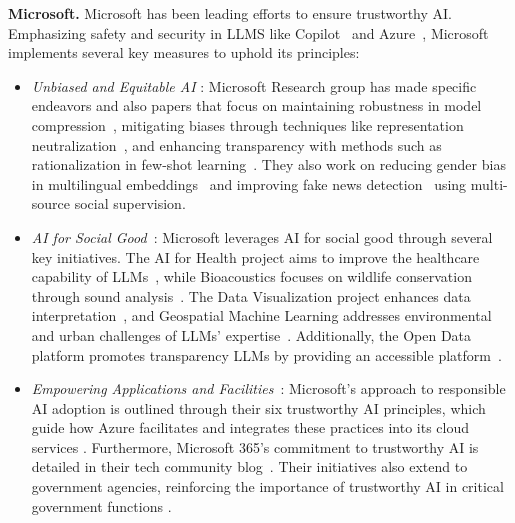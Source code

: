 \textbf{Microsoft.} Microsoft has been leading efforts to ensure trustworthy AI. Emphasizing safety and security in LLMS like Copilot~\cite{Copilot} and Azure~\cite{Azure}, Microsoft implements several key measures to uphold its principles:

\begin{itemize}[nolistsep, leftmargin=*]
    \item[] \textcolor[HTML]{e94e1a}{\largedot} {\textit{Unbiased and Equitable AI}} \cite{msr_trustworthy_ai_project}: Microsoft Research group has made specific endeavors and also papers that focus on maintaining robustness in model compression~\cite{du2023what}, mitigating biases through techniques like representation neutralization~\cite{du2021fairness}, and enhancing transparency with methods such as rationalization in few-shot learning~\cite{bhat2021self-training}. They also work on reducing gender bias in multilingual embeddings~\cite{zhao2020gender} and improving fake news detection~\cite{shu2020leveraging} using multi-source social supervision.
    \item[] \textcolor[HTML]{7cc627}{\largedot} {\textit{AI for Social Good}}~\cite{msr_ai_for_good_lab}: Microsoft leverages AI for social good through several key initiatives. The AI for Health project aims to improve the healthcare capability of LLMs~\cite{msr_ai_for_health}, while Bioacoustics focuses on wildlife conservation through sound analysis~\cite{msr_bioacoustics}. The Data Visualization project enhances data interpretation~\cite{msr_data_visualization}, and Geospatial Machine Learning addresses environmental and urban challenges of LLMs' expertise~\cite{msr_geospatial_machine_learning}. Additionally, the Open Data platform promotes transparency LLMs by providing an accessible platform~\cite{ms_open_data}.
    \item[] \textcolor[HTML]{00a8e8}{\largedot} {\textit{Empowering Applications and Facilities}}~\cite{responsible_trusted_ai_adoption, microsoft365_trustworthy, microsoft_ai_empowers_us_government}: Microsoft's approach to responsible AI adoption is outlined through their six trustworthy AI principles, which guide how Azure facilitates and integrates these practices into its cloud services \cite{responsible_trusted_ai_adoption}. Furthermore, Microsoft 365's commitment to trustworthy AI is detailed in their tech community blog~\cite{microsoft365_trustworthy}. Their initiatives also extend to government agencies,  reinforcing the importance of trustworthy AI in critical government functions \cite{microsoft_ai_empowers_us_government}.

\end{itemize}
